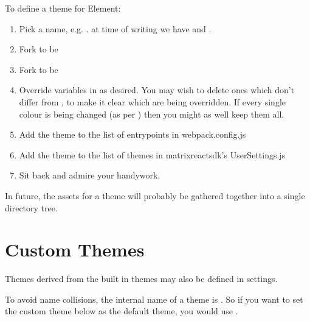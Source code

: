 \documentclass[letterpaper,10pt,openany,oneside,english]{sphinxmanual}
\begin{document}
\sphinxAtStartPar
To define a theme for Element:
\begin{enumerate}
%
\item {} 
\sphinxAtStartPar
Pick a name, e.g. . at time of writing we have  and .

\item {} 
\sphinxAtStartPar
Fork  to be 

\item {} 
\sphinxAtStartPar
Fork  to be 

\item {} 
\sphinxAtStartPar
Override variables in  as desired. You may wish to delete ones
which don’t differ from , to make it clear which are being
overridden. If every single colour is being changed (as per )
then you might as well keep them all.

\item {} 
\sphinxAtStartPar
Add the theme to the list of entrypoints in webpack.config.js

\item {} 
\sphinxAtStartPar
Add the theme to the list of themes in matrix\sphinxhyphen{}react\sphinxhyphen{}sdk’s UserSettings.js

\item {} 
\sphinxAtStartPar
Sit back and admire your handywork.

\end{enumerate}

\sphinxAtStartPar
In future, the assets for a theme will probably be gathered together into a
single directory tree.


\section{Custom Themes}
\label{\detokenize{theming:custom-themes}}
\sphinxAtStartPar
Themes derived from the built in themes may also be defined in settings.

\sphinxAtStartPar
To avoid name collisions, the internal name of a theme is
. So if you want to set the custom theme below as the
default theme, you would use .
\end{document}
